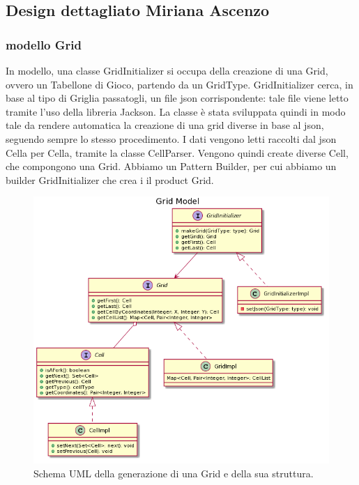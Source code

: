\documentclass[a4paper,12pt]{report}
\begin{document}
	\subsection{Design dettagliato Miriana Ascenzo}
    \subsubsection {modello Grid}
	In modello, una classe GridInitializer si occupa della creazione di una Grid, ovvero un Tabellone di Gioco, partendo da un GridType.
	GridInitializer cerca, in base al tipo di Griglia passatogli, un file json corrispondente: tale file viene letto tramite l'uso della libreria Jackson.
	La classe è stata sviluppata quindi in modo tale da rendere automatica la creazione di una grid diverse in base al json, seguendo sempre lo stesso procedimento.
	I dati vengono letti raccolti dal json Cella per Cella, tramite la classe CellParser.
	Vengono quindi create diverse Cell, che compongono una Grid.
    Abbiamo un Pattern Builder, per cui abbiamo un builder GridInitializer che crea i il product Grid.

	\begin{figure}[h]
		\centering{}
		\includegraphics[width=150mm]{images/ascenzo/grid_model.png}
		\caption{Schema UML della generazione di una Grid e della sua struttura.}
		\label{img:gridmodel}
	\end{figure}
\end{document}
